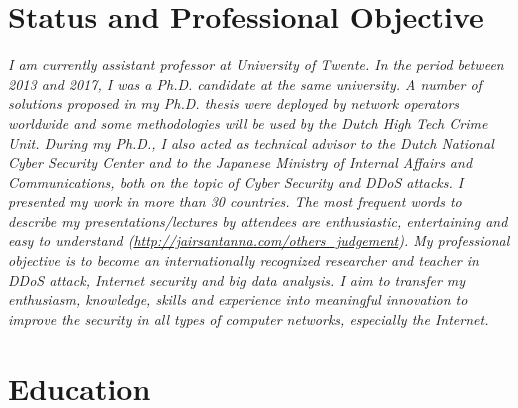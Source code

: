 \documentclass[print]{styles/friggeri-cv-mac} %
\begin{document}
\section{Status and Professional Objective}\vspace{-10pt}
\noindent\setlength\parindent{12pt}\textit{
	I am currently assistant professor at University of Twente. In the period between 2013 and 2017, I was a Ph.D. candidate at the same university. A number of solutions proposed in my Ph.D. thesis were deployed by network operators worldwide and some methodologies will be used by the Dutch High Tech Crime Unit. During my Ph.D., I also acted as technical advisor to the Dutch National Cyber Security Center and to the Japanese Ministry of Internal Affairs and Communications, both on the topic of Cyber Security and DDoS attacks. I presented my work in more than 30 countries. The most frequent words to describe my presentations/lectures by attendees are enthusiastic, entertaining and easy to understand (\url{http://jairsantanna.com/others_judgement}). 
	My professional objective is to become an internationally recognized researcher and teacher in DDoS attack, Internet security and big data analysis. I aim to transfer my enthusiasm, knowledge, skills and experience into meaningful innovation to improve the security in all types of computer networks, especially the Internet.
}



\setlength\parindent{0pt}
\section{Education}\vspace{-5pt}
\end{document}
